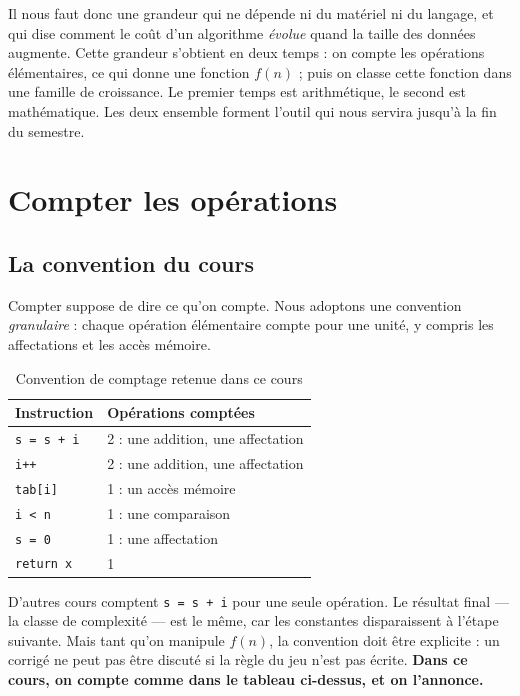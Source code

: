 \documentclass[11pt,a4paper]{article}
\theoremstyle{definition}
\theoremstyle{remark}
\begin{document}
Il nous faut donc une grandeur qui ne dépende ni du matériel ni du langage,
et qui dise comment le coût d'un algorithme \emph{évolue} quand la taille des
données augmente. Cette grandeur s'obtient en deux temps : on compte les
opérations élémentaires, ce qui donne une fonction $f(n)$ ; puis on classe
cette fonction dans une famille de croissance. Le premier temps est
arithmétique, le second est mathématique. Les deux ensemble forment l'outil
qui nous servira jusqu'à la fin du semestre.

\section{Compter les opérations}

\subsection{La convention du cours}

Compter suppose de dire ce qu'on compte. Nous adoptons une convention
\emph{granulaire} : chaque opération élémentaire compte pour une unité, y
compris les affectations et les accès mémoire.

\begin{table}[h!]
\centering
\caption{Convention de comptage retenue dans ce cours}
\begin{tabular}{ll}
\toprule
\textbf{Instruction} & \textbf{Opérations comptées} \\
\midrule
\texttt{s = s + i}    & 2 : une addition, une affectation \\
\texttt{i++}          & 2 : une addition, une affectation \\
\texttt{tab[i]}       & 1 : un accès mémoire \\
\texttt{i < n}        & 1 : une comparaison \\
\texttt{s = 0}        & 1 : une affectation \\
\texttt{return x}     & 1 \\
\bottomrule
\end{tabular}
\end{table}

\begin{attentionbox}
D'autres cours comptent \texttt{s = s + i} pour une seule opération. Le
résultat final --- la classe de complexité --- est le même, car les
constantes disparaissent à l'étape suivante. Mais tant qu'on manipule
$f(n)$, la convention doit être explicite : un corrigé ne peut pas être
discuté si la règle du jeu n'est pas écrite. \textbf{Dans ce cours, on
compte comme dans le tableau ci-dessus, et on l'annonce.}
\end{attentionbox}
\end{document}
